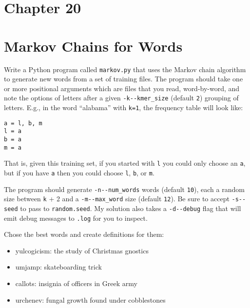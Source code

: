 \documentclass[]{article}
\providecommand{\tightlist}{%
  \setlength{\itemsep}{0pt}\setlength{\parskip}{0pt}}
\begin{document}
\pagebreak

\hypertarget{chapter-20}{%
\section{Chapter 20}\label{chapter-20}}

\hypertarget{markov-chains-for-words}{%
\section{Markov Chains for Words}\label{markov-chains-for-words}}

Write a Python program called \texttt{markov.py} that uses the Markov
chain algorithm to generate new words from a set of training files. The
program should take one or more positional arguments which are files
that you read, word-by-word, and note the options of letters after a
given \texttt{-k\textbar{}-\/-kmer\_size} (default \texttt{2}) grouping
of letters. E.g., in the word ``alabama'' with \texttt{k=1}, the
frequency table will look like:

\begin{verbatim}
a = l, b, m
l = a
b = a
m = a
\end{verbatim}

That is, given this training set, if you started with \texttt{l} you
could only choose an \texttt{a}, but if you have \texttt{a} then you
could choose \texttt{l}, \texttt{b}, or \texttt{m}.

The program should generate \texttt{-n\textbar{}-\/-num\_words} words
(default \texttt{10}), each a random size between \texttt{k} + 2 and a
\texttt{-m\textbar{}-\/-max\_word} size (default \texttt{12}). Be sure
to accept \texttt{-s\textbar{}-\/-seed} to pass to \texttt{random.seed}.
My solution also takes a \texttt{-d\textbar{}-\/-debug} flag that will
emit debug messages to \texttt{.log} for you to inspect.

Chose the best words and create definitions for them:

\begin{itemize}
\tightlist
\item
  yulcogicism: the study of Christmas gnostics
\item
  umjamp: skateboarding trick
\item
  callots: insignia of officers in Greek army
\item
  urchenev: fungal growth found under cobblestones
\end{itemize}
\end{document}
